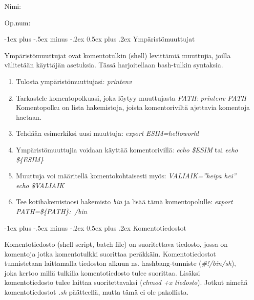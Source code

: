 \documentclass[12pt,portrait,a4]{article}
\makeatletter
\renewcommand{\section}{\@startsection{section}{1}{0mm}%
                                {-1ex plus -.5ex minus -.2ex}%
                                {0.5ex plus .2ex}%
                                {\normalfont\large\bfseries}}
\makeatother
\begin{document}
\raggedbottom

\begin{multicols}{2}
\setlength{\premulticols}{1pt}
\setlength{\postmulticols}{1pt}
\setlength{\multicolsep}{1pt}
\setlength{\columnsep}{2pt}

Nimi:\hrulefill

Op.num:\hrulefill

\end{multicols}

\section{Ympäristömuuttujat}

Ympäristömuuttujat ovat komentotulkin (shell) levittämiä muuttujia, joilla
välitetään käyttäjän asetuksia.  Tässä harjoitellaan bash-tulkin syntaksia.

\begin{enumerate}
\item Tulosta ympäristömuuttujasi: \emph{printenv}
\item Tarkastele komentopolkuasi, joka löytyy muuttujasta \emph{PATH}:
\emph{printenv PATH} \\
Komentopolku on lista hakemistoja, joista komentoriviltä ajettavia komentoja
haetaan.
\item Tehdään esimerkiksi uusi muuttuja: \emph{export ESIM=helloworld}
\item Ympäristömuuttujia voidaan käyttää komentorivillä: \emph{echo \$ESIM}
tai \emph{echo \$\{ESIM\}}
\item Muuttuja voi määritellä komentokohtaisesti myös: \emph{VALIAIK=''heipa
hei'' echo \$VALIAIK}
\item Tee kotihakemistoosi hakemisto \emph{bin} ja lisää tämä
komentopolulle: \emph{export PATH=\$\{PATH\}:~/bin}
\end{enumerate}

\section{Komentotiedostot}

Komentotiedosto (shell script, batch file) on suoritettava tiedosto, jossa
on komentoja jotka komentotulkki suorittaa peräkkäin.  Komentotiedostot
tunnistetaan laittamalla tiedoston alkuun ns. hashbang-tunniste 
(\emph{\#!/bin/sh}), joka kertoo millä tulkilla komentotiedosto tulee
suorittaa.  Lisäksi komentotiedosto tulee laittaa suoritettavaksi
(\emph{chmod +x tiedosto}).  Jotkut nimeää komentotiedostot \emph{.sh}
päätteellä, mutta tämä ei ole pakollista.
\end{document}
